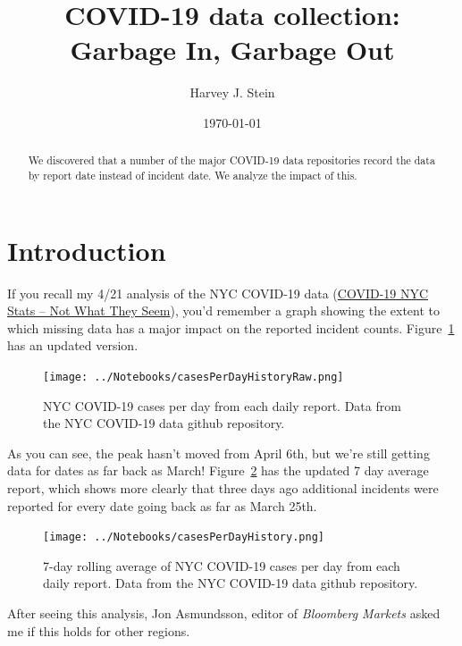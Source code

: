 \documentclass[10pt,reqno]{amsart}
\author{Harvey J. Stein}
\date{\today}
\begin{document}
\title{COVID-19 data collection: Garbage In, Garbage Out}

\begin{abstract}
  We discovered that a number of the major COVID-19 data repositories
  record the data by report date instead of incident date.  We analyze
  the impact of this.
\end{abstract}

\maketitle
\tableofcontents

\section{Introduction}
\label{sec:intro}
If you recall my 4/21 analysis of the NYC COVID-19 data
(\href{https://hjstein.blogspot.com/2020/04/covid-19-nyc-stats-not-what-they-seem.html}{COVID-19 NYC Stats -- Not What They Seem}),
you'd remember a graph showing the extent to which missing
data has a major impact on the reported incident
counts.\nocite{nyc2020data,Stein2020nycdata,Stein2020owiddata,owid2020data}
Figure~\ref{fig:daily} has an updated version.\nocite{Stein2020Seem}\nocite{Stein2020Ray}

\begin{figure}[H]
  \centering
  \texttt{[image: ../Notebooks/casesPerDayHistoryRaw.png]}
  \caption{NYC COVID-19 cases per day from each daily report.  Data
    from the NYC COVID-19 data github repository.}
  \label{fig:daily}
\end{figure}

As you can see, the peak hasn't moved from April 6th, but we're still
getting data for dates as far back as March!
Figure~\ref{fig:smoothDaily} has the updated 7 day average report,
which shows more clearly that three days ago additional incidents were
reported for every date going back as far as March 25th.

\begin{figure}[H]
  \centering
  \texttt{[image: ../Notebooks/casesPerDayHistory.png]}
  \caption{7-day rolling average of NYC COVID-19 cases per day from each daily report.  Data
    from the NYC COVID-19 data github repository.}
  \label{fig:smoothDaily}
\end{figure}

After seeing this analysis, Jon Asmundsson, editor of {\it Bloomberg
  Markets} asked me if this holds for other regions.\cite{Asmundsson2020Dates}
\end{document}
